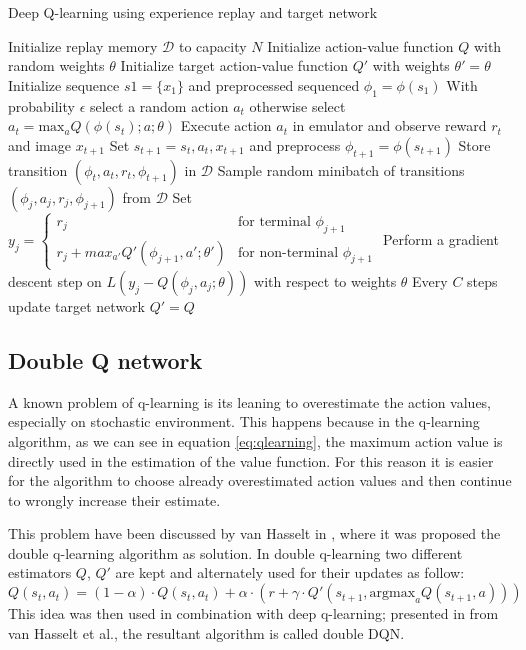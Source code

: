\documentclass[article,11pt]{article}
\begin{document}
	\begin{algorithm}
		\caption{Deep Q-learning using experience replay and target network}
		\label{alg:dqn}
		\small
		\begin{algorithmic}
		\STATE Initialize replay memory $\mathcal{D}$ to capacity $N$
		\STATE Initialize action-value function $Q$ with random weights $\theta$
		\STATE Initialize target action-value function $Q'$ with weights $\theta'=\theta$
		\STATE Initialize sequence $s1 = \{x_1\}$ and preprocessed sequenced $\phi_1 = \phi(s_1)$
		\STATE With probability $\epsilon$ select a random action $a_t$
		\STATE otherwise select $a_t = \text{max}_a Q(\phi(s_t); a; \theta)$
		\STATE Execute action $a_t$ in emulator and observe reward $r_t$ and image $x_{t+1}$
		\STATE Set $s_{t+1} = s_t, a_t, x_{t+1}$ and preprocess $\phi_{t+1} = \phi(s_{t+1})$
		\STATE Store transition $(\phi_t, a_t, r_t, \phi_{t+1})$ in $\mathcal{D}$
		\STATE Sample random minibatch of transitions $(\phi_j, a_j, r_j, \phi_{j+1})$ from $\mathcal{D}$
		\STATE Set $y_j =
		\begin{cases}
			r_j & \text{for terminal } \phi_{j+1} \\
			r_j + max_{a'} Q'(\phi_{j+1}, a'; \theta') & \text{for non-terminal } \phi_{j+1}
		\end{cases}$
		\STATE Perform a gradient descent step on $L(y_j - Q(\phi_j, a_j ; \theta))$ with respect to weights $\theta$ 
		\STATE Every $C$ steps update target network $Q'=Q$
		\ENDFOR
		\ENDFOR
		\end{algorithmic}
	\end{algorithm}

	\subsection{Double Q network}
	A known problem of q-learning is its leaning to overestimate the action values, especially on stochastic environment. This happens because in the q-learning algorithm, as we can see in equation \ref{eq:qlearning}, the maximum action value is directly used in the estimation of the value function. For this reason it is easier for the algorithm to choose already overestimated action values and then continue to wrongly increase their estimate.
	
	This problem have been discussed by van Hasselt in \cite{doubleq}, where it was proposed the double q-learning algorithm as solution. In double q-learning two different estimators $Q$, $Q'$ are kept and alternately used for their updates as follow:
	\begin{equation}
		\label{eq:doubleq}
		Q(s_t, a_t)=(1-\alpha)\cdot Q(s_t, a_t) + \alpha \cdot (r + \gamma\cdot Q'(s_{t+1}, \text{argmax}_aQ(s_{t+1}, a)))
	\end{equation}
	This idea was then used in combination with deep q-learning; presented in \cite{doubledqn} from van Hasselt et al., the resultant algorithm is called double DQN.
	
\end{document}
